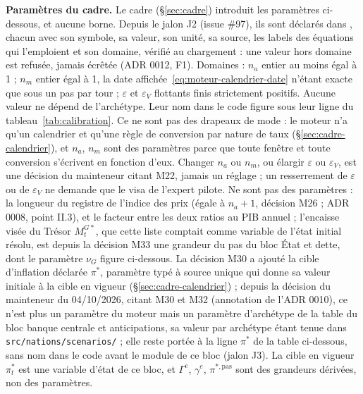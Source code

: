 \documentclass[11pt,a4paper]{article}
\newcommand{\code}[1]{\texttt{\detokenize{#1}}}
\begin{document}
\textbf{Paramètres du cadre.} Le cadre (\S\ref{sec:cadre}) introduit les paramètres ci-dessous, et aucune borne. Depuis le jalon J2 (issue \#97), ils sont déclarés dans \code{nations.moteur.parametres.cadre}, chacun avec son symbole, sa valeur, son unité, sa source, les labels des équations qui l'emploient et son domaine, vérifié au chargement : une valeur hors domaine est refusée, jamais écrêtée (ADR 0012, F1). Domaines : $n_a$ entier au moins égal à 1 ; $n_m$ entier égal à 1, la date affichée~\eqref{eq:moteur-calendrier-date} n'étant exacte que sous un pas par tour ; $\varepsilon$ et $\varepsilon_V$ flottants finis strictement positifs. Aucune valeur ne dépend de l'archétype. Leur nom dans le code figure sous leur ligne du tableau~\ref{tab:calibration}. Ce ne sont pas des drapeaux de mode : le moteur n'a qu'un calendrier et qu'une règle de conversion par nature de taux (\S\ref{sec:cadre-calendrier}), et $n_a$, $n_m$ sont des paramètres parce que toute fenêtre et toute conversion s'écrivent en fonction d'eux. Changer $n_a$ ou $n_m$, ou élargir $\varepsilon$ ou $\varepsilon_V$, est une décision du mainteneur citant M22, jamais un réglage ; un resserrement de $\varepsilon$ ou de $\varepsilon_V$ ne demande que le visa de l'expert pilote. Ne sont pas des paramètres : la longueur du registre de l'indice des prix (égale à $n_a + 1$, décision M26 ; ADR 0008, point II.3), et le facteur entre les deux ratios au PIB annuel ; l'encaisse visée du Trésor $M^{G*}_t$, que cette liste comptait comme variable de l'état initial résolu, est depuis la décision M33 une grandeur du pas du bloc État et dette, dont le paramètre $\nu_G$ figure ci-dessous. La décision M30 a ajouté la cible d'inflation déclarée $\pi^\ast$, paramètre typé à source unique qui donne sa valeur initiale à la cible en vigueur (\S\ref{sec:cadre-calendrier}) ; depuis la décision du mainteneur du 04/10/2026, citant M30 et M32 (annotation de l'ADR 0010), ce n'est plus un paramètre du moteur mais un paramètre d'archétype de la table du bloc banque centrale et anticipations, sa valeur par archétype étant tenue dans \nolinkurl{src/nations/scenarios/} ; elle reste portée à la ligne $\pi^\ast$ de la table ci-dessous, sans nom dans le code avant le module de ce bloc (jalon J3). La cible en vigueur $\pi^\ast_t$ est une variable d'état de ce bloc, et $\Gamma^e$, $\gamma^e$, $\pi^{\ast,\mathrm{pas}}$ sont des grandeurs dérivées, non des paramètres.
\end{document}
